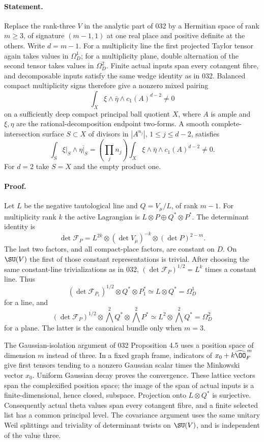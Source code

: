 \paragraph{Statement.}
Replace the rank-three $V$ in the analytic part of 032 by a Hermitian
space of rank $m\geq3$, of signature $(m-1,1)$ at one real place and
positive definite at the others. Write $d=m-1$. For a multiplicity line
the first projected Taylor tensor again takes values in $\Omega_D^1$;
for a multiplicity plane, double alternation of the second tensor takes
values in $\Omega_D^2$. Finite actual inputs span every cotangent
fibre, and decomposable inputs satisfy the same wedge identity as in
032. Balanced compact multiplicity signs therefore give a nonzero
mixed pairing
\begin{equation}\label{A4-pair}
 \int_X\xi\wedge\bar\eta\wedge c_1(A)^{d-2}\ne0
\end{equation}
on a sufficiently deep compact principal ball quotient $X$, where
$A$ is ample and $\xi,\eta$ are the rational-decomposition endpoint
two-forms. A smooth complete-intersection surface $S\subset X$ of
divisors in $|A^{n_j}|$, $1\leq j\leq d-2$, satisfies
\[
 \int_S\xi|_S\wedge\overline{\eta|_S}
 =\left(\prod_jn_j\right)
      \int_X\xi\wedge\bar\eta\wedge c_1(A)^{d-2}\ne0.
\]
For $d=2$ take $S=X$ and the empty product one.

\paragraph{Proof.}
Let $L$ be the negative tautological line and $Q=V_\mu/L$, of rank
$m-1$. For multiplicity rank $k$ the active Lagrangian is
$L\otimes P\oplus Q^*\otimes P^*$. The determinant identity is
\[
 \det\mathcal F_P
 =L^{2k}\otimes(\det V_\mu)^{-k}\otimes(\det P)^{2-m}.
\]
The last two factors, and all compact-place factors, are constant on
$D$. On $\SU(V)$ the first of those constant representations is
trivial. After choosing the same constant-line trivializations as in
032, $(\det\mathcal F_P)^{1/2}=L^k$ times a constant line. Thus
\[
 (\det\mathcal F_{P_1})^{1/2}\otimes Q^*\otimes P_1^*
       \simeq L\otimes Q^*=\Omega_D^1
\]
for a line, and
\[
 (\det\mathcal F_P)^{1/2}\otimes
             \bigwedge^2Q^*\otimes\bigwedge^2P^*
       \simeq L^2\otimes\bigwedge^2Q^*=\Omega_D^2
\]
for a plane. The latter is the canonical bundle only when $m=3$.

The Gaussian-isolation argument of 032 Proposition 4.5 uses a position
space of dimension $m$ instead of three. In a fixed graph frame,
indicators of $x_0+k\widehat{\OO}_F^{\,m}$ give first tensors tending
to a nonzero Gaussian scalar times the Minkowski vector $x_0$.
Uniform Gaussian decay proves the convergence. These lattice vectors
span the complexified position space; the image of the span of actual
inputs is a finite-dimensional, hence closed, subspace. Projection
onto $L\otimes Q^*$ is surjective. Consequently actual theta values
span every cotangent fibre, and a finite selected list has a common
principal level. The covariance argument uses the same unitary Weil
splittings and triviality of determinant twists on $\SU(V)$, and is
independent of the value three.

